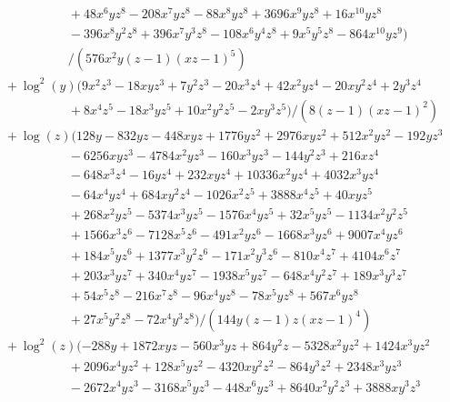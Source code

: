 \documentclass[letter,11pt,DIV=12,abstract=true,numbers=noenddot,titlepage=false,twocolumn=false,draft=false]{scrartcl}
\begin{document}
\begin{equation}
\begin{split}
      & \qquad \qquad \qquad + 48 x^6 y z^8 - 208 x^7 y z^8 - 88 x^8 y z^8 + 3696 x^9 y z^8 + 16 x^{10} y z^8\\
      & \qquad \qquad \qquad - 396 x^8 y^2 z^8 + 396 x^7 y^3 z^8 - 108 x^6 y^4 z^8 + 9 x^5 y^5 z^8 - 864 x^{10} y z^9)\\
      & \qquad \qquad \qquad /(576 x^2 y (z-1) (x z-1)^5)\\
& \quad + \log^2(y) (9 x^2 z^3 - 18 x y z^3 + 7 y^2 z^3 - 20 x^3 z^4 + 42 x^2 y z^4 - 20 x y^2 z^4 + 2 y^3 z^4\\
      & \qquad \qquad \qquad + 8 x^4 z^5 - 18 x^3 y z^5 + 10 x^2 y^2 z^5 - 2 x y^3 z^5)/(8 (z-1) (x z-1)^2)\\
& \quad + \log(z) (128 y - 832 y z - 448 x y z + 1776 y z^2 + 2976 x y z^2 + 512 x^2 y z^2 - 192 y z^3\\
      & \qquad \qquad \qquad - 6256 x y z^3 - 4784 x^2 y z^3 - 160 x^3 y z^3 - 144 y^2 z^3 + 216 x z^4\\
      & \qquad \qquad \qquad - 648 x^3 z^4 - 16 y z^4 + 232 x y z^4 + 10336 x^2 y z^4 + 4032 x^3 y z^4\\
      & \qquad \qquad \qquad - 64 x^4 y z^4 + 684 x y^2 z^4 - 1026 x^2 z^5 + 3888 x^4 z^5 + 40 x y z^5\\
      & \qquad \qquad \qquad + 268 x^2 y z^5 - 5374 x^3 y z^5 - 1576 x^4 y z^5 + 32 x^5 y z^5 - 1134 x^2 y^2 z^5\\
      & \qquad \qquad \qquad + 1566 x^3 z^6 - 7128 x^5 z^6 - 491 x^2 y z^6 - 1668 x^3 y z^6 + 9007 x^4 y z^6\\
      & \qquad \qquad \qquad + 184 x^5 y z^6 + 1377 x^3 y^2 z^6 - 171 x^2 y^3 z^6 - 810 x^4 z^7 + 4104 x^6 z^7\\
      & \qquad \qquad \qquad + 203 x^3 y z^7 + 340 x^4 y z^7 - 1938 x^5 y z^7 - 648 x^4 y^2 z^7 + 189 x^3 y^3 z^7\\
      & \qquad \qquad \qquad + 54 x^5 z^8 - 216 x^7 z^8 - 96 x^4 y z^8 - 78 x^5 y z^8 + 567 x^6 y z^8\\
      & \qquad \qquad \qquad + 27 x^5 y^2 z^8 - 72 x^4 y^3 z^8)/(144 y (z-1) z (x z-1)^4)\\
& \quad + \log^2(z) (-288 y + 1872 x y z - 560 x^3 y z + 864 y^2 z - 5328 x^2 y z^2 + 1424 x^3 y z^2\\
      & \qquad \qquad \qquad + 2096 x^4 y z^2 + 128 x^5 y z^2 - 4320 x y^2 z^2 - 864 y^3 z^2 + 2348 x^3 y z^3\\
      & \qquad \qquad \qquad - 2672 x^4 y z^3 - 3168 x^5 y z^3 - 448 x^6 y z^3 + 8640 x^2 y^2 z^3 + 3888 x y^3 z^3\\

\end{split}
\end{equation}
\end{document}

